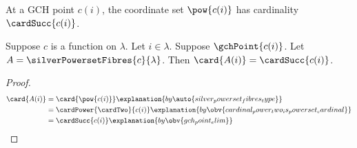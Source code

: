 At a GCH point $c(i)$, the coordinate set $\pow{c(i)}$ has cardinality
$\cardSucc{c(i)}$.

\begin{proposition}\label{silver_powerset_fibre_at_gch_point}
    Suppose $c$ is a function on $\lambda$.
    Let $i\in\lambda$.
    Suppose $\gchPoint{c(i)}$.
    Let $A=\silverPowersetFibres{c}{\lambda}$.
    Then $\card{A(i)}=\cardSucc{c(i)}$.
\end{proposition}
\begin{proof}
    \begin{align*}
        \card{A(i)}
            &= \card{\pow{c(i)}}
                \explanation{by \auto{silver_powerset_fibres_type}}
            \\
            &= \cardPower{\cardTwo}{c(i)}
                \explanation{by \obv{cardinal_power_two_is_powerset_cardinal}}
            \\
            &= \cardSucc{c(i)}
                \explanation{by \obv{gch_point_elim}}
    \end{align*}
\end{proof}

